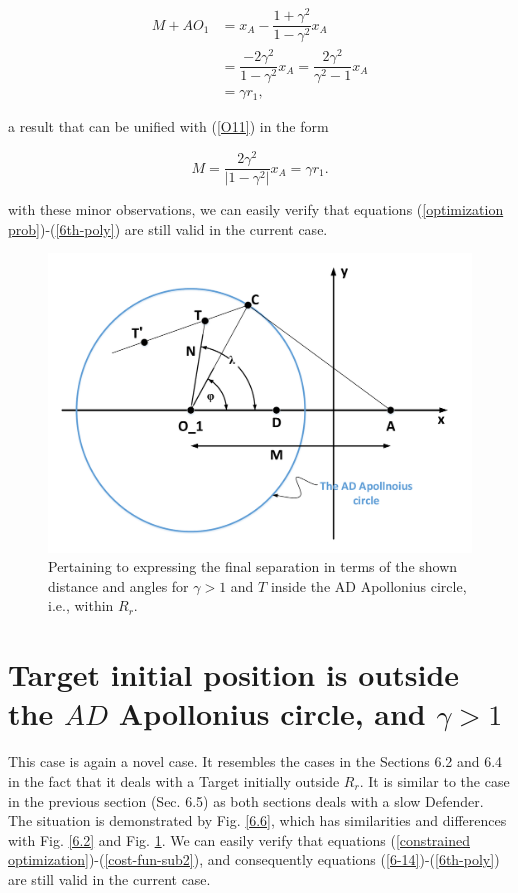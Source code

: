 \begin{equation}
\begin{split}
M+ AO_1 &= x_A - \dfrac{1+\gamma^2}{1-\gamma^2} x_A\\
& = \dfrac{-2 \gamma^2}{1-\gamma^2}x_A = \dfrac{2 \gamma^2}{\gamma^2 -1}x_A\\
& = \gamma r_1,
\end{split}
\end{equation}

a result that can be unified with (\ref{O11}) in the form

\begin{equation}
M= \dfrac{2 \gamma^2}{\lvert 1-\gamma^2 \rvert} x_A = \gamma r_1.
\end{equation}

with these minor observations, we can easily verify that equations (\ref{optimization prob})-(\ref{6th-poly}) are still valid in the current case.

\begin{figure}[H]
\centering
\includegraphics[width=1.0\textwidth]{fig/Drawing6_5.pdf}
\caption{Pertaining to expressing the final separation in terms of the shown distance and angles for $\gamma>1$ and $T$ inside the AD Apollonius circle, i.e., within $R_r$.}
\label{6.5}
\end{figure}

\section{Target initial position is outside the $AD$ Apollonius circle, and $\gamma>1$}
This case is again a novel case. It resembles the cases in the Sections 6.2 and 6.4 in the fact that it deals with a Target initially outside $R_r$. It is similar to the case in the previous section (Sec. 6.5) as both sections deals with a slow Defender. The situation is demonstrated by Fig. \ref{6.6}, which has similarities and differences with Fig. \ref{6.2} and Fig. \ref{6.5}. We can easily verify that equations (\ref{constrained optimization})-(\ref{cost-fun-sub2}), and consequently equations (\ref{6-14})-(\ref{6th-poly}) are still valid in the current case.

